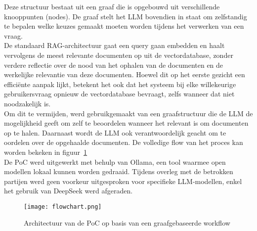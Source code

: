Deze structuur bestaat uit een graaf die is opgebouwd uit verschillende knooppunten (nodes). De graaf stelt het LLM bovendien in staat om zelfstandig te bepalen welke keuzes gemaakt moeten worden tijdens het verwerken van een vraag.
\\[1em]
De standaard RAG-architectuur gaat een query gaan embedden en haalt vervolgens de meest relevante documenten op uit de vectordatabase, zonder verdere reflectie over de nood van het ophalen van de documenten en de werkelijke relevantie van deze documenten. Hoewel dit op het eerste gezicht een efficiënte aanpak lijkt, betekent het ook dat het systeem bij elke willekeurige gebruikersvraag opnieuw de vectordatabase bevraagt, zelfs wanneer dat niet noodzakelijk is.
\\[1em]
Om dit te vermijden, werd gebruikgemaakt van een graafstructuur die de LLM de mogelijkheid geeft om zelf te beoordelen wanneer het relevant is om documenten op te halen. Daarnaast wordt de LLM ook verantwoordelijk geacht om te oordelen over de opgehaalde documenten. De volledige flow van het proces kan worden bekeken in figuur~\ref{fig:Architectuur}
\\[1em]
De PoC werd uitgewerkt met behulp van Ollama, een tool waarmee open modellen lokaal kunnen worden gedraaid. Tijdens overleg met de betrokken partijen werd geen voorkeur uitgesproken voor specifieke LLM-modellen, enkel het gebruik van DeepSeek werd afgeraden.
\begin{figure}[H]
    \texttt{[image: flowchart.png]}
    \caption{Architectuur van de PoC op basis van een graafgebaseerde workflow}
    \label{fig:Architectuur}
\end{figure}


